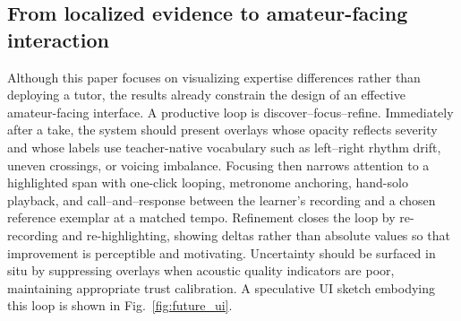 \documentclass[sigconf,review,anonymous]{acmart}
\makeatletter
\newcommand{\Fig}{Fig.\@\xspace} %
\makeatother
\begin{document}
\subsection{From localized evidence to amateur-facing interaction}
Although this paper focuses on visualizing expertise differences rather than deploying a tutor, the results already constrain the design of an effective amateur-facing interface. A productive loop is discover–focus–refine. Immediately after a take, the system should present overlays whose opacity reflects severity and whose labels use teacher-native vocabulary such as left–right rhythm drift, uneven crossings, or voicing imbalance. Focusing then narrows attention to a highlighted span with one-click looping, metronome anchoring, hand-solo playback, and call–and–response between the learner’s recording and a chosen reference exemplar at a matched tempo. Refinement closes the loop by re-recording and re-highlighting, showing deltas rather than absolute values so that improvement is perceptible and motivating. Uncertainty should be surfaced in situ by suppressing overlays when acoustic quality indicators are poor, maintaining appropriate trust calibration. A speculative UI sketch embodying this loop is shown in \Fig~\ref{fig:future_ui}.
\end{document}
